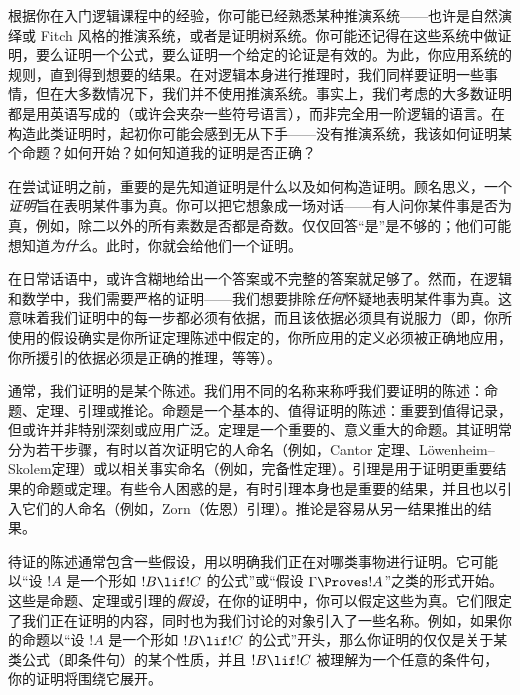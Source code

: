 \documentclass[../../../include/open-logic-section]{subfiles}
\begin{document}


根据你在入门逻辑课程中的经验，你可能已经熟悉某种推演系统——也许是自然演绎或 Fitch 风格的推演系统，或者是证明树系统。你可能还记得在这些系统中做证明，要么证明一个公式，要么证明一个给定的论证是有效的。为此，你应用系统的规则，直到得到想要的结果。在对逻辑本身进行推理时，我们同样要证明一些事情，但在大多数情况下，我们并不使用推演系统。事实上，我们考虑的大多数证明都是用英语写成的（或许会夹杂一些符号语言），而非完全用一阶逻辑的语言。在构造此类证明时，起初你可能会感到无从下手——没有推演系统，我该如何证明某个命题？如何开始？如何知道我的证明是否正确？

在尝试证明之前，重要的是先知道证明是什么以及如何构造证明。顾名思义，一个\emph{证明}旨在表明某件事为真。你可以把它想象成一场对话——有人问你某件事是否为真，例如，除二以外的所有素数是否都是奇数。仅仅回答“是”是不够的；他们可能想知道\emph{为什么}。此时，你就会给他们一个证明。

在日常话语中，或许含糊地给出一个答案或不完整的答案就足够了。然而，在逻辑和数学中，我们需要严格的证明——我们想要排除\emph{任何}怀疑地表明某件事为真。这意味着我们证明中的每一步都必须有依据，而且该依据必须具有说服力（即，你所使用的假设确实是你所证定理陈述中假定的，你所应用的定义必须被正确地应用，你所援引的依据必须是正确的推理，等等）。

通常，我们证明的是某个陈述。我们用不同的名称来称呼我们要证明的陈述：命题、定理、引理或推论。命题是一个基本的、值得证明的陈述：重要到值得记录，但或许并非特别深刻或应用广泛。定理是一个重要的、意义重大的命题。其证明常分为若干步骤，有时以首次证明它的人命名（例如，Cantor 定理、Löwenheim–Skolem定理）或以相关事实命名（例如，完备性定理）。引理是用于证明更重要结果的命题或定理。有些令人困惑的是，有时引理本身也是重要的结果，并且也以引入它们的人命名（例如，Zorn（佐恩）引理）。推论是容易从另一结果推出的结果。

待证的陈述通常包含一些假设，用以明确我们正在对哪类事物进行证明。它可能以“设 $!A$ 是一个形如 $!B \lif !C$ 的公式”或“假设 $\Gamma \Proves !A$”之类的形式开始。这些是命题、定理或引理的\emph{假设}，在你的证明中，你可以假定这些为真。它们限定了我们正在证明的内容，同时也为我们讨论的对象引入了一些名称。例如，如果你的命题以“设 $!A$ 是一个形如 $!B \lif !C$ 的公式”开头，那么你证明的仅仅是关于某类公式（即条件句）的某个性质，并且 $!B \lif !C$ 被理解为一个任意的条件句，你的证明将围绕它展开。
\end{document}
